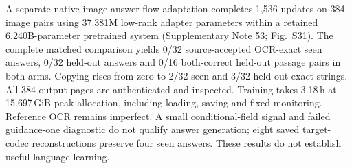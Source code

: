 A separate native image-answer flow adaptation completes 1,536 updates on
384 image pairs using 37.381M low-rank adapter parameters within a retained
6.240B-parameter pretrained system (Supplementary Note 53; Fig.~S31).
The complete matched comparison yields 0/32 source-accepted OCR-exact seen
answers, 0/32 held-out answers and 0/16 both-correct held-out passage pairs
in both arms. Copying rises from zero to 2/32 seen and 3/32 held-out exact
strings. All 384 output pages are authenticated and inspected. Training takes
3.18\,h at 15.697\,GiB peak allocation, including loading, saving and fixed
monitoring. Reference OCR remains imperfect. A small conditional-field signal
and failed guidance-one diagnostic do not qualify answer generation; eight
saved target-codec reconstructions preserve four seen answers. These results
do not establish useful language learning.
